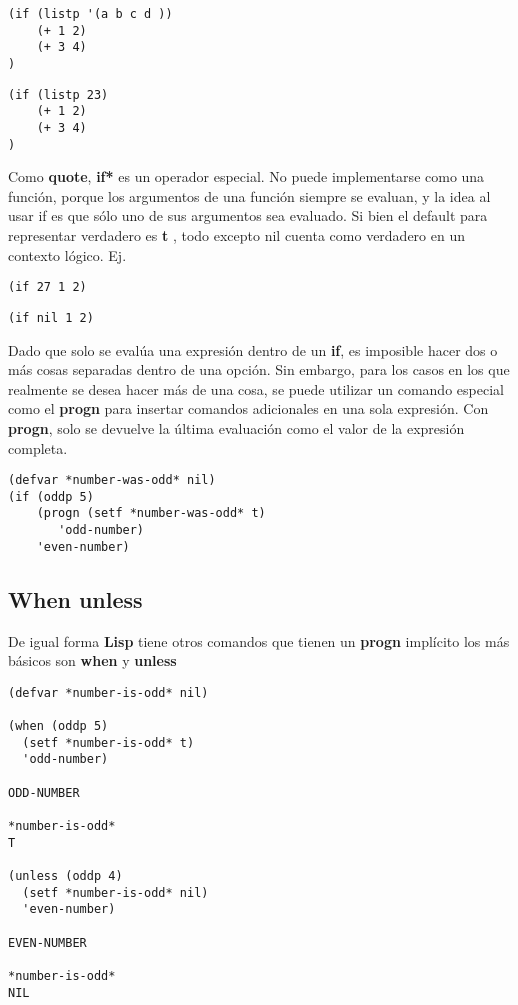 \documentclass[11pt]{article}
\begin{document}
\begin{verbatim}
(if (listp '(a b c d ))
	(+ 1 2)
	(+ 3 4)
)
\end{verbatim}

\begin{verbatim}
(if (listp 23)
	(+ 1 2)
	(+ 3 4)
)
\end{verbatim}

Como \textbf{quote}, \textbf{if*} es un operador especial. No puede implementarse como
una función, porque los argumentos de una función siempre se evaluan,
y la idea al usar if es que sólo uno de sus argumentos sea evaluado.
Si bien el default para representar verdadero es \textbf{t} , todo excepto nil
cuenta como verdadero en un contexto lógico. Ej.

\begin{verbatim}
(if 27 1 2)
\end{verbatim}

\begin{verbatim}
(if nil 1 2)
\end{verbatim}

Dado que solo se evalúa una expresión dentro de un \textbf{if}, es imposible
hacer dos o más cosas separadas dentro de una opción. Sin embargo,
para los casos en los que realmente se desea hacer más de una cosa, se
puede utilizar un comando especial como el \textbf{progn} para insertar
comandos adicionales en una sola expresión. Con \textbf{progn}, solo se
devuelve la última evaluación como el valor de la expresión completa.



\begin{verbatim}
(defvar *number-was-odd* nil)
(if (oddp 5)
	(progn (setf *number-was-odd* t)
	   'odd-number)
	'even-number)
\end{verbatim}

\subsection*{When unless}
\label{sec:org4a5703f}

De igual forma \textbf{Lisp} tiene otros comandos que tienen un \textbf{progn}
implícito los más básicos son \textbf{when} y \textbf{unless}  

\begin{verbatim}
(defvar *number-is-odd* nil)

(when (oddp 5)
  (setf *number-is-odd* t)
  'odd-number)

ODD-NUMBER

*number-is-odd*
T

(unless (oddp 4)
  (setf *number-is-odd* nil)
  'even-number)

EVEN-NUMBER

*number-is-odd*
NIL
\end{verbatim}
\end{document}
